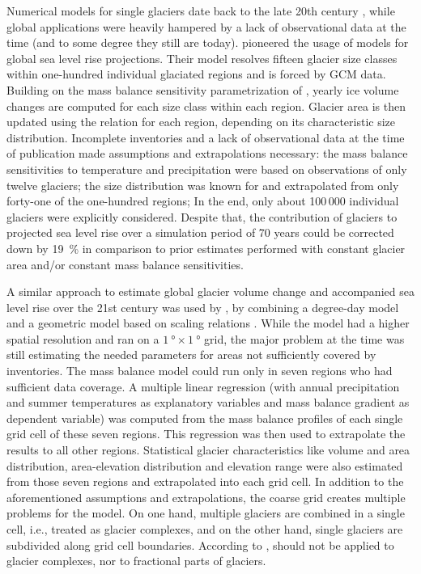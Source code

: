     Numerical models for single glaciers date back to the late 20th century \citep[e.g.,][]{Budd1975, Bindschadler1982, Oerlemans1997}, while global applications were heavily hampered by a lack of observational data at the time (and to some degree they still are today). \citet{VanDeWal2001} pioneered the usage of \vas{} models for global sea level rise projections. Their model resolves fifteen glacier size classes within one-hundred individual glaciated regions and is forced by GCM data. Building on the mass balance sensitivity parametrization of \citet{Gregory1998}, yearly ice volume changes are computed for each size class within each region. Glacier area is then updated using the \vas{} relation for each region, depending on its characteristic size distribution. Incomplete inventories and a lack of observational data at the time of publication made assumptions and extrapolations necessary: the mass balance sensitivities to temperature and precipitation were based on observations of only twelve glaciers; the size distribution was known for and extrapolated from only forty-one of the one-hundred regions; In the end, only about 100\,000 individual glaciers were explicitly considered. Despite that, the contribution of glaciers to projected sea level rise over a simulation period of 70 years could be corrected down by \SI{19}{\percent} in comparison to prior estimates performed with constant glacier area and/or constant mass balance sensitivities.

    A similar approach to estimate global glacier volume change and accompanied sea level rise over the 21st century was used by \citet{Raper2006}, by combining a degree-day model \citep{Braithwaite2003} and a geometric model based on scaling relations \citep{Raper2000}. While the model had a higher spatial resolution and ran on a $\SI{1}{\degree}\times\SI{1}{\degree}$ grid, the major problem at the time was still estimating the needed parameters for areas not sufficiently covered by inventories. The mass balance model could run only in seven regions who had sufficient data coverage. A multiple linear regression (with annual precipitation and summer temperatures as explanatory variables and mass balance gradient as dependent variable) was computed from the mass balance profiles of each single grid cell of these seven regions. This regression was then used to extrapolate the results to all other regions. Statistical glacier characteristics like volume and area distribution, area-elevation distribution and elevation range were also estimated from those seven regions and extrapolated into each grid cell. In addition to the aforementioned assumptions and extrapolations, the coarse grid creates multiple problems for the \vas{} model. On one hand, multiple glaciers are combined in a single cell, i.e., treated as glacier complexes, and on the other hand, single glaciers are subdivided along grid cell boundaries. According to \citet[Section 8.6]{Bahr2015}, \vas{} should not be applied to glacier complexes, nor to fractional parts of glaciers.

